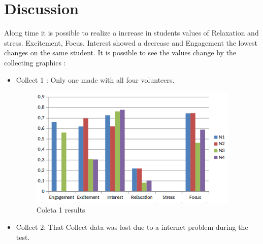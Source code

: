 \documentclass[12pt,openright,a4paper]{article}
\begin{document}
\section{Discussion}
Along time it is possible to realize a increase in students values of Relaxation and stress. Excitement, Focus, Interest showed a decrease and Engagement the lowest changes on the same student. It is possible to see the values change by the collecting graphics :
\begin{itemize}
\item Collect 1 : Only one made with all four volunteers.
\begin{figure}[H]
	\centering
	\includegraphics[width=10cm]{./Coleta1.png}
    \caption{Coleta 1 results}
\end{figure}
\item Collect 2: That Collect data was lost due to a internet problem during the test.


\end{itemize}
\end{document}
